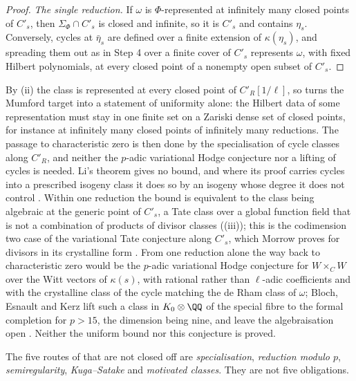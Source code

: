 \begin{proof}
\emph{The single reduction.} If $\omega$ is $\Phi$-represented at infinitely
many closed points of $C'_{s}$, then $\Sigma_{\Phi}\cap C'_{s}$ is closed and
infinite, so it is $C'_{s}$ and contains $\eta_{s}$. Conversely, cycles at
$\bar\eta_{s}$ are defined over a finite extension of $\kappa(\eta_{s})$, and
spreading them out as in Step 4 over a finite cover of $C'_{s}$ represents
$\omega$, with fixed Hilbert polynomials, at every closed point of a nonempty
open subset of $C'_{s}$.
\end{proof}

\begin{remark}\label{rem:modpremains}
By (ii) the class is represented at every closed point of
$C'_{R}[1/\ell]$, so  turns the Mumford target into a
statement of uniformity alone: the Hilbert data of some representation must
stay in one finite set on a Zariski dense set of closed points, for instance
at infinitely many closed points of infinitely many reductions. The passage
to characteristic zero is then done by the specialisation of cycle classes
along $C'_{R}$, and neither the $p$-adic variational Hodge conjecture nor a
lifting of cycles is needed. Li's theorem gives no bound, and where its proof
carries cycles into a prescribed isogeny class it does so by an isogeny whose
degree it does not control \cite[proof of Theorem~1.2, Step~3]{Li26}. Within
one reduction the
bound is equivalent to the class being algebraic at the generic point of
$C'_{s}$, a Tate class over a global function field that is not a combination
of products of divisor classes ((iii)); this is the
codimension two case of the variational Tate conjecture along $C'_{s}$, which
Morrow proves for divisors in its crystalline form \cite{Mor19}. From one
reduction alone the way back to characteristic zero would be the $p$-adic
variational Hodge conjecture for $W\times_{C}W$ over the Witt vectors of
$\kappa(s)$, with rational rather than $\ell$-adic coefficients and with the
crystalline class of the cycle matching the de Rham class of $\omega$; Bloch,
Esnault and Kerz lift such a class in $K_{0}\otimes\QQ$ of the special fibre
to the formal completion for $p>15$, the dimension being nine, and leave the
algebraisation open \cite[Theorem~1.3]{BEK14}. Neither the uniform bound nor
this conjecture is proved.
\end{remark}

The five routes of  that are not closed off are
\emph{specialisation}, \emph{reduction modulo $p$}, \emph{semiregularity},
\emph{Kuga--Satake} and \emph{motivated classes}. They are not five
obligations.

